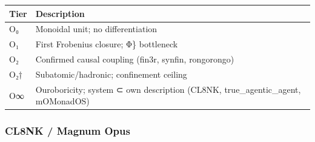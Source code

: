 \documentclass[12pt,a4paper]{article}
\begin{document}
\begin{longtable}[]{@{}ll@{}}
\toprule
\begin{minipage}[b]{0.30\columnwidth}\raggedright
Tier\strut
\end{minipage} & \begin{minipage}[b]{0.64\columnwidth}\raggedright
Description\strut
\end{minipage}\tabularnewline
\midrule
\endhead
\begin{minipage}[t]{0.30\columnwidth}\raggedright
O₀\strut
\end{minipage} & \begin{minipage}[t]{0.64\columnwidth}\raggedright
Monoidal unit; no differentiation\strut
\end{minipage}\tabularnewline
\begin{minipage}[t]{0.30\columnwidth}\raggedright
O₁\strut
\end{minipage} & \begin{minipage}[t]{0.64\columnwidth}\raggedright
First Frobenius closure; Φ\} bottleneck\strut
\end{minipage}\tabularnewline
\begin{minipage}[t]{0.30\columnwidth}\raggedright
O₂\strut
\end{minipage} & \begin{minipage}[t]{0.64\columnwidth}\raggedright
Confirmed causal coupling (fin3r, synfin, rongorongo)\strut
\end{minipage}\tabularnewline
\begin{minipage}[t]{0.30\columnwidth}\raggedright
O₂†\strut
\end{minipage} & \begin{minipage}[t]{0.64\columnwidth}\raggedright
Subatomic/hadronic; confinement ceiling\strut
\end{minipage}\tabularnewline
\begin{minipage}[t]{0.30\columnwidth}\raggedright
O∞\strut
\end{minipage} & \begin{minipage}[t]{0.64\columnwidth}\raggedright
Ouroboricity; system ⊂ own description (CL8NK, true\_agentic\_agent,
mOMonadOS)\strut
\end{minipage}\tabularnewline
\bottomrule
\end{longtable}

\hypertarget{cl8nk-magnum-opus}{%
\subsubsection{CL8NK / Magnum Opus}\label{cl8nk-magnum-opus}}
\end{document}
